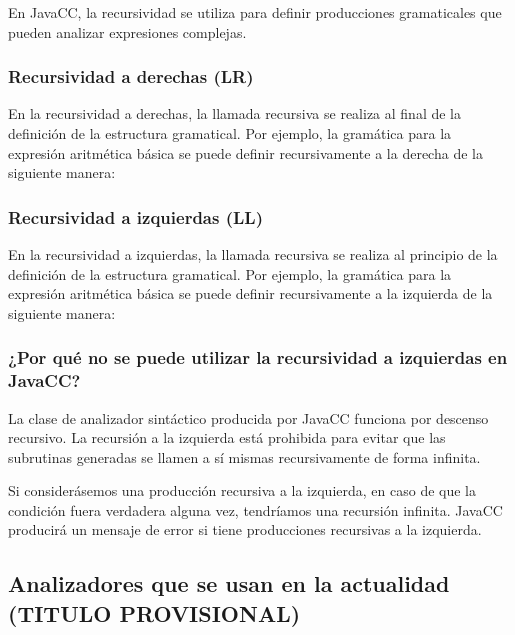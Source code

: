 En JavaCC, la recursividad se utiliza para definir producciones gramaticales que pueden analizar expresiones complejas.

\subsubsection{Recursividad a derechas (LR)}
\noindent En la recursividad a derechas, la llamada recursiva se realiza al final de la definición de la estructura gramatical. Por ejemplo, la gramática para la expresión aritmética básica se puede definir recursivamente a la derecha de la siguiente manera:

\lstset{inputencoding=utf8/latin1}


\subsubsection{Recursividad a izquierdas (LL)}

\noindent En la recursividad a izquierdas, la llamada recursiva se realiza al principio de la definición de la estructura gramatical. Por ejemplo, la gramática para la expresión aritmética básica se puede definir recursivamente a la izquierda de la siguiente manera:

\lstset{inputencoding=utf8/latin1}


\subsubsection{¿Por qué no se puede utilizar la recursividad a izquierdas en JavaCC?}
\noindent La clase de analizador sintáctico producida por JavaCC funciona por descenso recursivo. La recursión a la izquierda está prohibida para evitar que las subrutinas generadas se llamen a sí mismas recursivamente de forma infinita.

Si considerásemos una producción recursiva a la izquierda, en caso de que la  condición fuera verdadera alguna vez, tendríamos una recursión infinita.
JavaCC producirá un mensaje de error si tiene producciones recursivas a la izquierda.

\subsection{Analizadores que se usan en la actualidad (TITULO PROVISIONAL)}

